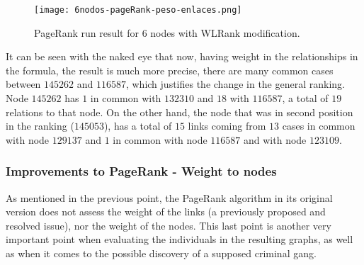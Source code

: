 \begin{figure}
	\centering
	\texttt{[image: 6nodos-pageRank-peso-enlaces.png]}
	\caption{PageRank run result for 6 nodes with WLRank modification.} 
	\label{fig:6nodos-pageRank-peso-enlaces}
\end{figure}

It can be seen with the naked eye that now, having weight in the relationships in the formula, the result is much more precise, there are many common cases between $145262$ and $116587$, which justifies the change in the general ranking. Node $145262$ has $1$ in common with $132310$ and $18$ with $116587$, a total of $19$ relations to that node. On the other hand, the node that was in second position in the ranking ($145053$), has a total of $15$ links coming from $13$ cases in common with node $129137$ and $1$ in common with node $116587$ and with node $123109$.

\subsubsection{Improvements to PageRank - Weight to nodes}

As mentioned in the previous point, the PageRank algorithm in its original version does not assess the weight of the links (a previously proposed and resolved issue), nor the weight of the nodes. This last point is another very important point when evaluating the individuals in the resulting graphs, as well as when it comes to the possible discovery of a supposed criminal gang.

